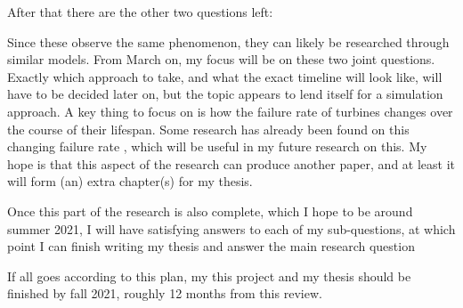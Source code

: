 \documentclass[a4paper,12pt]{article}
\begin{document}
After that there are the other two questions left:

\sqb*

\sqc*

Since these observe the same phenomenon, they can likely be researched through similar models. From March on, my focus will be on these two joint questions. Exactly which approach to take, and what the exact timeline will look like, will have to be decided later on, but the topic appears to lend itself for a simulation approach. A key thing to focus on is how the failure rate of turbines changes over the course of their lifespan. Some research has already been found on this changing failure rate \cite{carroll2015offshore,papatzimos2019data}, which will be useful in my future research on this. My hope is that this aspect of the research can produce another paper, and at least it will form (an) extra chapter(s) for my thesis. 

Once this part of the research is also complete, which I hope to be around summer 2021, I will have satisfying answers to each of my sub-questions, at which point I can finish writing my thesis and answer the main research question

\rquest

If all goes according to this plan, my this project and my thesis should be finished by fall 2021, roughly 12 months from this review. 

\pagebreak



\end{document}
